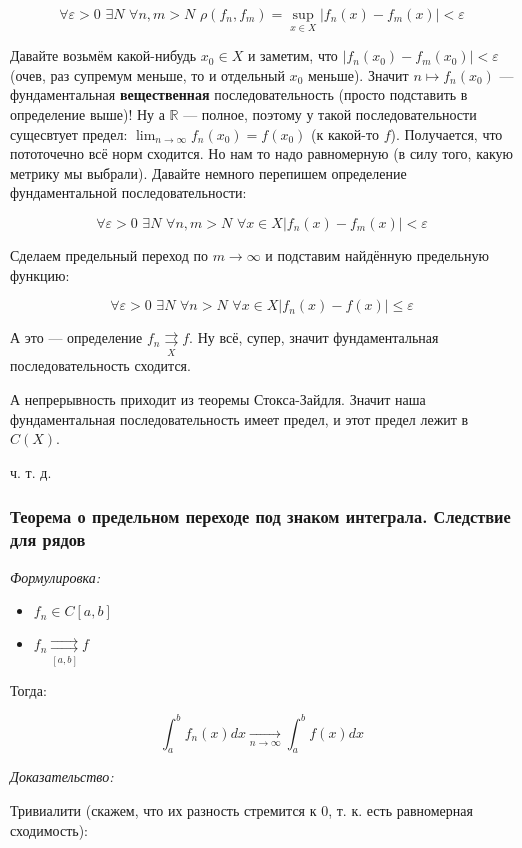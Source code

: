 \documentclass{article}
\def\dbl{\,\,}
\def\rsh#1{\underset{#1}{\rightrightarrows}}
\begin{document}
\[\forall \varepsilon > 0 \dbl \exists N \dbl \forall n, m > N \dbl \rho(f_n, f_m) = \sup_{x \in X}|f_n(x) - f_m(x)| < \varepsilon\]

Давайте возьмём какой-нибудь $x_0 \in X$ и заметим, что $|f_n(x_0) - f_m(x_0)| < \varepsilon$ (очев, раз супремум меньше, то и отдельный $x_0$ меньше). Значит $n \mapsto f_n(x_0)$ --- фундаментальная \textbf{вещественная} последовательность (просто подставить в определение выше)! Ну а $\mathbb{R}$ --- полное, поэтому у такой последовательности сущесвтует предел: $\lim_{n \rightarrow \infty} f_n(x_0) = f(x_0)$ (к какой-то $f$). Получается, что пототочечно всё норм сходится. Но нам то надо равномерную (в силу того, какую метрику мы выбрали). Давайте немного перепишем определение фундаментальной последовательности:

\[\forall \varepsilon > 0 \dbl \exists N \dbl \forall n, m > N \dbl \forall x \in X |f_n(x) - f_m(x)| < \varepsilon\]

Сделаем предельный переход по $m \rightarrow \infty$ и подставим найдённую предельную функцию: 

\[\forall \varepsilon > 0 \dbl \exists N \dbl \forall n > N \dbl \forall x \in X |f_n(x) - f(x)| \le \varepsilon\]

А это --- определение $f_n \rsh{X} f$. Ну всё, супер, значит фундаментальная последовательность сходится.

А непрерывность приходит из теоремы Стокса-Зайдля. Значит наша фундаментальная последовательность имеет предел, и этот предел лежит в $C(X)$.

ч. т. д. 

\subsubsection{Теорема о предельном переходе под знаком интеграла. Следствие для рядов}
\textit{Формулировка:}

\begin{itemize}
    \item $f_n \in C[a, b]$
    \item $f_n \rsh{[a, b]} f$
\end{itemize}

Тогда:

\[\int_a^b{f_n(x)dx} \underset{n \rightarrow \infty}{\longrightarrow} \int_a^b{f(x)dx}\]

\textit{Доказательство:}

Тривиалити (скажем, что их разность стремится к 0, т. к. есть равномерная сходимость): 
\end{document}
